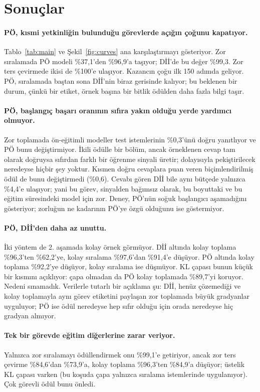\documentclass[10pt,twocolumn]{article}
\begin{document}
\section{Sonuçlar}
\paragraph{PÖ, kısmi yetkinliğin bulunduğu görevlerde açığın çoğunu kapatıyor.}
Tablo~\ref{tab:main} ve Şekil~\ref{fig:curves} ana karşılaştırmayı gösteriyor. Zor sıralamada PÖ
modeli \%37,1'den \%96,9'a taşıyor; Dİİ'de bu değer \%99,3. Zor ters çevirmede ikisi de \%100'e
ulaşıyor. Kazancın çoğu ilk 150 adımda geliyor. PÖ, sıralamada baştan sona Dİİ'nin biraz gerisinde
kalıyor; bu beklenen bir durum, çünkü bir etiket, örnek başına bir bitlik ödülden daha fazla bilgi
taşır.

\paragraph{PÖ, başlangıç başarı oranının sıfıra yakın olduğu yerde yardımcı olmuyor.}
Zor toplamada ön-eğitimli modeller test istemlerinin \%0,3'ünü doğru yanıtlıyor ve PÖ bunu
değiştirmiyor. İkili ödülle bir bölüm, ancak örneklenen cevap tam olarak doğruysa sıfırdan farklı
bir öğrenme sinyali üretir; dolayısıyla pekiştirilecek neredeyse hiçbir şey yoktur. Kısmen doğru
cevaplara puan veren biçimlendirilmiş ödül de bunu değiştirmedi (\%0,6). Cevabı gören Dİİ bile aynı
bütçede yalnızca \%4,4'e ulaşıyor; yani bu görev, sinyalden bağımsız olarak, bu boyuttaki ve bu
eğitim süresindeki model için zor. Deney, PÖ'nün soğuk başlangıcı aşamadığını gösteriyor; zorluğun
ne kadarının PÖ'ye özgü olduğunu ise göstermiyor.

\paragraph{PÖ, Dİİ'den daha az unuttu.}
İki yöntem de 2. aşamada kolay örnek görmüyor. Dİİ altında kolay toplama \%96,3'ten \%62,2'ye,
kolay sıralama \%97,6'dan \%91,4'e düşüyor. PÖ altında kolay toplama \%92,2'ye düşüyor, kolay
sıralama ise düşmüyor. KL çapası bunun küçük bir kısmını açıklıyor: çapa olmadan da PÖ kolay
toplamada \%89,7'yi koruyor. Nedeni sınamadık. Verilerle tutarlı bir açıklama şu: Dİİ, henüz
çözemediği ve kolay toplamayla aynı görev etiketini paylaşan zor toplamada büyük gradyanlar
uyguluyor; PÖ ise ödül neredeyse hep sıfır olduğu için orada neredeyse hiç gradyan almıyor.

\paragraph{Tek bir görevde eğitim diğerlerine zarar veriyor.}
Yalnızca zor sıralamayı ödüllendirmek onu \%99,1'e getiriyor, ancak zor ters çevirme \%84,6'dan
\%73,9'a, kolay toplama \%96,3'ten \%84,9'a düşüyor; üstelik KL çapası varken (bu koşuda çapa
yalnızca sıralama istemlerinde uygulanıyor). Çok görevli ödül bunu önledi.
\end{document}

